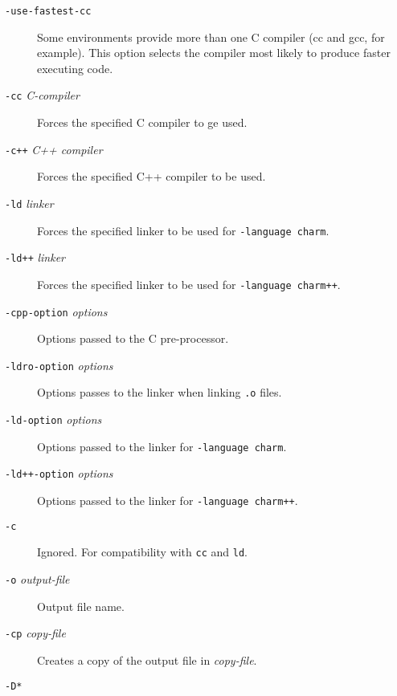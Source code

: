 \begin{description}
\item[{\tt -use-fastest-cc}]

Some environments provide more than one C compiler (cc and gcc, for
example).  This option selects the compiler most likely to produce
faster executing code.

\item[{\tt -cc} {\em C-compiler}]

Forces the specified C compiler to ge used.

\item[{\tt -c++} {\em C++ compiler}]

Forces the specified C++ compiler to be used.

\item[{\tt -ld} {\em linker}]

Forces the specified linker to be used for {\tt -language charm}.

\item[{\tt -ld++} {\em linker}]

Forces the specified linker to be used for {\tt -language charm++}.

\item[{\tt -cpp-option} {\em options}]

Options passed to the C pre-processor.

\item[{\tt -ldro-option} {\em options}]

Options passes to the linker when linking {\tt .o} files.

\item[{\tt -ld-option} {\em options}]

Options passed to the linker for {\tt -language charm}.

\item[{\tt -ld++-option} {\em options}]

Options passed to the linker for {\tt -language charm++}.

\item[{\tt -c}]

Ignored.  For compatibility with {\tt cc} and {\tt ld}.

\item[{\tt -o} {\em output-file}]

Output file name.

\item[{\tt -cp} {\em copy-file}]

Creates a copy of the output file in {\em copy-file}.

\item[{\tt -D*}]


\end{description}
